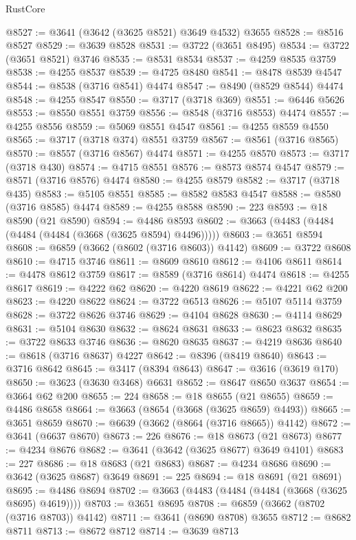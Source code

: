 \begin{lexlean}{RustCore}
\begin{coremodule}
@8527 := @3641 (@3642 (@3625 @8521) @3649 @4532) @3655
@8528 := @8516 @8527
@8529 := @3639 @8528
@8531 := @3722 (@3651 @8495)
@8534 := @3722 (@3651 @8521) @3746
@8535 := @8531 @8534
@8537 := @4259 @8535 @3759
@8538 := @4255 @8537
@8539 := @4725 @8480
@8541 := @8478 @8539 @4547
@8544 := @8538 (@3716 @8541) @4474
@8547 := @8490 (@8529 @8544) @4474
@8548 := @4255 @8547
@8550 := @3717 (@3718 @369)
@8551 := @6446 @5626
@8553 := @8550 @8551 @3759
@8556 := @8548 (@3716 @8553) @4474
@8557 := @4255 @8556
@8559 := @5069 @8551 @4547
@8561 := @4255 @8559 @4550
@8565 := @3717 (@3718 @374) @8551 @3759
@8567 := @8561 (@3716 @8565)
@8570 := @8557 (@3716 @8567) @4474
@8571 := @4255 @8570
@8573 := @3717 (@3718 @430)
@8574 := @4715 @8551
@8576 := @8573 @8574 @4547
@8579 := @8571 (@3716 @8576) @4474
@8580 := @4255 @8579
@8582 := @3717 (@3718 @435)
@8583 := @5105 @8551
@8585 := @8582 @8583 @4547
@8588 := @8580 (@3716 @8585) @4474
@8589 := @4255 @8588
@8590 := 223
@8593 := @18 @8590 (@21 @8590)
@8594 := @4486 @8593
@8602 := @3663 (@4483 (@4484 (@4484 (@4484 (@3668 (@3625 @8594) @4496)))))
@8603 := @3651 @8594
@8608 := @6859 (@3662 (@8602 (@3716 @8603)) @4142)
@8609 := @3722 @8608
@8610 := @4715 @3746
@8611 := @8609 @8610
@8612 := @4106 @8611
@8614 := @4478 @8612 @3759
@8617 := @8589 (@3716 @8614) @4474
@8618 := @4255 @8617
@8619 := @4222 @62
@8620 := @4220 @8619
@8622 := @4221 @62 @200
@8623 := @4220 @8622
@8624 := @3722 @6513
@8626 := @5107 @5114 @3759
@8628 := @3722 @8626 @3746
@8629 := @4104 @8628
@8630 := @4114 @8629
@8631 := @5104 @8630
@8632 := @8624 @8631
@8633 := @8623 @8632
@8635 := @3722 @8633 @3746
@8636 := @8620 @8635
@8637 := @4219 @8636
@8640 := @8618 (@3716 @8637) @4227
@8642 := @8396 (@8419 @8640)
@8643 := @3716 @8642
@8645 := @3417 (@8394 @8643)
@8647 := @3616 (@3619 @170)
@8650 := @3623 (@3630 @3468) @6631
@8652 := @8647 @8650 @3637
@8654 := @3664 @62 @200
@8655 := 224
@8658 := @18 @8655 (@21 @8655)
@8659 := @4486 @8658
@8664 := @3663 (@8654 (@3668 (@3625 @8659) @4493))
@8665 := @3651 @8659
@8670 := @6639 (@3662 (@8664 (@3716 @8665)) @4142)
@8672 := @3641 (@6637 @8670)
@8673 := 226
@8676 := @18 @8673 (@21 @8673)
@8677 := @4234 @8676
@8682 := @3641 (@3642 (@3625 @8677) @3649 @4101)
@8683 := 227
@8686 := @18 @8683 (@21 @8683)
@8687 := @4234 @8686
@8690 := @3642 (@3625 @8687) @3649
@8691 := 225
@8694 := @18 @8691 (@21 @8691)
@8695 := @4486 @8694
@8702 := @3663 (@4483 (@4484 (@4484 (@3668 (@3625 @8695) @4619))))
@8703 := @3651 @8695
@8708 := @6859 (@3662 (@8702 (@3716 @8703)) @4142)
@8711 := @3641 (@8690 @8708) @3655
@8712 := @8682 @8711
@8713 := @8672 @8712
@8714 := @3639 @8713

\end{coremodule}
\end{lexlean}
